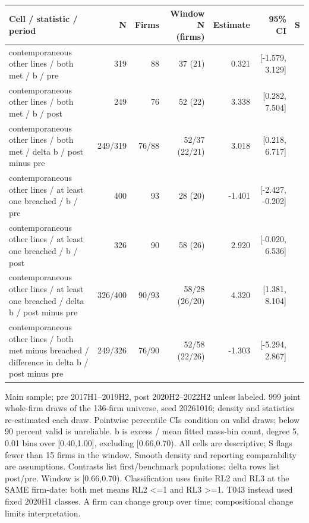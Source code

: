\begingroup\scriptsize\setlength{\tabcolsep}{3pt}
\begin{threeparttable}
\begin{tabular}{p{5.7cm}rrrrrl}
\toprule
Cell / statistic / period & N & Firms & Window N (firms) & Estimate & 95\% CI & S \\
\midrule
contemporaneous other lines / both met / b / pre & 319 & 88 & 37 (21) & 0.321 & [-1.579, 3.129] &  \\
contemporaneous other lines / both met / b / post & 249 & 76 & 52 (22) & 3.338 & [0.282, 7.504] &  \\
contemporaneous other lines / both met / delta b / post minus pre & 249/319 & 76/88 & 52/37 (22/21) & 3.018 & [0.218, 6.717] &  \\
contemporaneous other lines / at least one breached / b / pre & 400 & 93 & 28 (20) & -1.401 & [-2.427, -0.202] &  \\
contemporaneous other lines / at least one breached / b / post & 326 & 90 & 58 (26) & 2.920 & [-0.020, 6.536] &  \\
contemporaneous other lines / at least one breached / delta b / post minus pre & 326/400 & 90/93 & 58/28 (26/20) & 4.320 & [1.381, 8.104] &  \\
contemporaneous other lines / both met minus breached / difference in delta b / post minus pre & 249/326 & 76/90 & 52/58 (22/26) & -1.303 & [-5.294, 2.867] &  \\
\bottomrule
\end{tabular}
\begin{tablenotes}[flushleft]\footnotesize
\item[] Main sample; pre 2017H1--2019H2, post 2020H2--2022H2 unless labeled. 999 joint whole-firm draws of the 136-firm universe, seed 20261016; density and statistics re-estimated each draw. Pointwise percentile CIs condition on valid draws; below 90 percent valid is unreliable. b is excess / mean fitted mass-bin count, degree 5, 0.01 bins over [0.40,1.00], excluding [0.66,0.70). All cells are descriptive; S flags fewer than 15 firms in the window. Smooth density and reporting comparability are assumptions. Contrasts list first/benchmark populations; delta rows list post/pre. Window is [0.66,0.70). Classification uses finite RL2 and RL3 at the SAME firm-date: both met means RL2 <=1 and RL3 >=1. T043 instead used fixed 2020H1 classes. A firm can change group over time; compositional change limits interpretation.
\end{tablenotes}
\end{threeparttable}
\endgroup
\par\medskip

